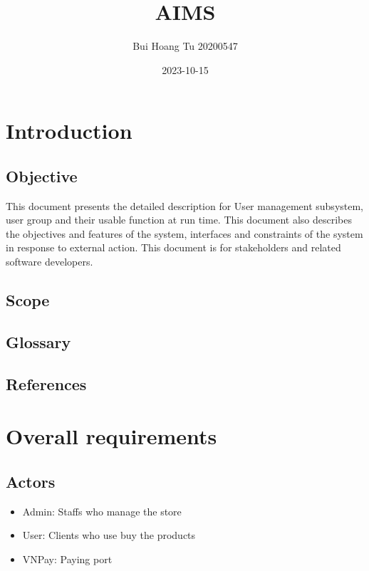 \documentclass[letterpaper]{report}
\title{AIMS}
\author{Bui Hoang Tu 20200547}
\date{2023-10-15}
\begin{document}

\setcounter{tocdepth}{3}

\tableofcontents
\clearpage

\chapter{Introduction}
\section{Objective}
This document presents the detailed description for User management subsystem, user group and their usable function at run time. This document also describes the objectives and features of the system, interfaces and constraints of the system in response to external action.
This document is for stakeholders and related software developers.

\section{Scope}
\section{Glossary}
\section{References}

\chapter{Overall requirements}
\section{Actors}
\begin{itemize}
    \item Admin: Staffs who manage the store
    \item User: Clients who use buy the products
    \item VNPay: Paying port
\end{itemize}
\clearpage
\end{document}
